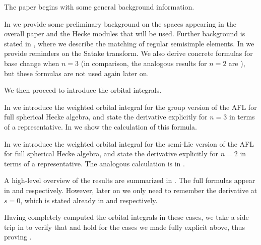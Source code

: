 \begin{itemize}
  \ii The paper begins with some general background information.
  \begin{itemize}
    \ii In  we provide some preliminary background
    on the spaces appearing in the overall paper and the Hecke modules that will be used.
    \ii Further background is stated in ,
    where we describe the matching of regular semisimple elements.
    \ii In  we provide reminders on the Satake transform.
    We also derive concrete formulas for base change when $n = 3$
    (in comparison, the analogous results for $n=2$ are
    \cite[Lemma 7.1.1]{ref:AFLspherical}),
    but these formulas are not used again later on.
  \end{itemize}

  \ii We then proceed to introduce the orbital integrals.
  \begin{itemize}
    \ii In  we introduce the weighted orbital integral
    for the group version of the AFL for full spherical Hecke algebra,
    and state the derivative explicitly for $n = 3$ in terms of a representative.
    In  we show the calculation of this formula.

    \ii In  we introduce the weighted orbital integral
    for the semi-Lie version of the AFL for full spherical Hecke algebra,
    and state the derivative explicitly for $n = 2$ in terms of a representative.
    The analogous calculation is in .
  \end{itemize}
  A high-level overview of the results are summarized in .
  The full formulas appear in  and  respectively.
  However, later on we only need to remember the derivative at $s = 0$,
  which is stated already in  and  respectively.

  \ii Having completely computed the orbital integrals in these cases,
  we take a side trip in  to verify that
   and 
  hold for the cases we made fully explicit above,
  thus proving .


\end{itemize}
